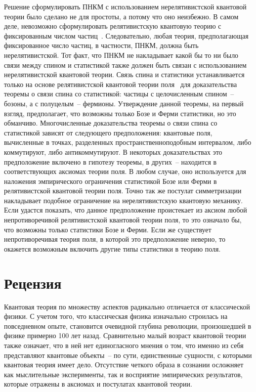 \documentclass[a4paper, 12pt]{article}
\begin{document}
Решение сформулировать ПНКМ с использованием нерелятивистской квантовой 
теории было сделано не для простоты, а потому что оно неизбежно. В самом 
деле, невозможно сформулировать релятивистскую квантовую теорию 
с фиксированным числом частиц~\cite[Гл.~1.1]{ref16}.
Следовательно, любая теория, предполагающая фиксированное число частиц, 
в частности, ПНКМ, должна быть нерелятивистской. Тот факт, что ПНКМ не 
накладывает какой бы то ни было связи между спином и статистикой также 
должен быть связан с использованием нерелятивистской квантовой теории. 
Связь спина и статистики устанавливается только на основе релятивистской 
квантовой теории поля~\cite{ref15, ref17} %
для доказательства теоремы о связи спина со статистикой:
частицы с целочисленным спином~-- бозоны, а с полуцелым~-- фермионы.
Утверждение данной теоремы, на первый взгляд, предполагает, что возможны 
только Бозе и Ферми статистики, но это обманчиво. Многочисленные 
доказательства теоремы о связи спина со статистикой зависят от 
следующего предположения: квантовые поля, вычисленные в точках, 
разделенных пространственноподобным интервалом, либо коммутируют, либо 
антикоммутируют. В некоторых доказательствах это предположение включено 
в гипотезу теоремы, в других~-- находится в соответствующих аксиомах 
теории поля. В любом случае, оно используется для наложения 
эмпирического ограничения статистикой Бозе или Ферми в релятивистской 
квантовой теории поля. Точно так же постулат симметризации накладывает 
подобное ограничение на нерелятивистскую квантовую механику. Если 
удастся показать, что данное предположение проистекает из аксиом любой 
непротиворечивой релятивистской квантовой теории поля, то это означало 
бы, что возможны только статистики Бозе и Ферми. Если же существует 
непротиворечивая теория поля, в которой это предположение неверно, то 
окажется возможным включить другие типы статистики в теорию поля.



\clearpage \section*{Рецензия}
\label{sec:review}

Квантовая теория по множеству аспектов радикально отличается от 
классической физики. С учетом того, что классическая физика изначально 
строилась на повседневном опыте, становится очевидной глубина революции, 
произошедшей в физике примерно 100 лет назад. Сравнительно малый возраст 
квантовой теории также означает, что в ней нет единогласного мнения 
о том, что именно из себя представляют квантовые объекты~-- по сути, 
единственные сущности, с которыми квантовая теория имеет дело. 
Отсутствие четкого образа в сознании осложняет как мыслительные 
эксперименты, так и восприятие эмпирических результатов, которые 
отражены в аксиомах и постулатах квантовой теории.
\end{document}
